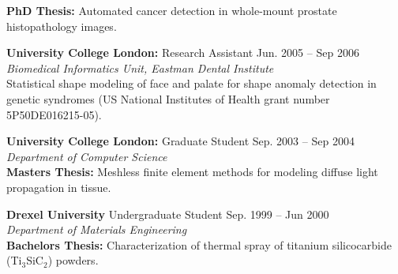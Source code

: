 \documentclass[line,a4paper]{resume}
\newcommand{\subscript}[1]{\ensuremath{_{\text{#1}}}}
\begin{document}
\begin{resume}
\begin{minipage}{\textwidth}
	  \textbf{PhD Thesis:} Automated cancer detection in whole-mount prostate histopathology images.\vspace{1mm}\\%
	\end{minipage}
	\begin{minipage}{\textwidth}
	\textbf{University College London:} Research Assistant \hfill Jun. 2005 -- Sep 2006 \\%
	\textsl{Biomedical Informatics Unit, Eastman Dental Institute}\vspace{1mm}\\
	  Statistical shape modeling of face and palate for shape anomaly detection in genetic syndromes (US National Institutes of Health grant number 5P50DE016215-05). \vspace{1mm}\\%
	\end{minipage}
	\begin{minipage}{\textwidth}
	\textbf{University College London:} Graduate Student \hfill Sep. 2003 -- Sep 2004 \\%
	\textsl{Department of Computer Science}\vspace{1mm}\\
	\textbf{Masters Thesis:} Meshless finite element methods for modeling diffuse light propagation in tissue. \vspace{1mm}\\%
	\end{minipage}
	\begin{minipage}{\textwidth}
	\textbf{Drexel University} Undergraduate Student \hfill Sep. 1999 -- Jun 2000 \\%
	\textsl{Department of Materials Engineering}\vspace{1mm}\\
	\textbf{Bachelors Thesis:} Characterization of thermal spray of titanium silicocarbide (Ti\subscript{3}SiC\subscript{2}) powders.  \vspace{1mm}\\%
	\end{minipage}

\end{resume}
\end{document}
